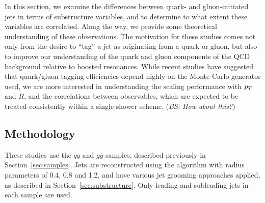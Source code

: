 In this section, we examine the differences between quark- and gluon-initiated jets in terms of substructure variables, and to determine to what extent these variables are correlated. Along the way, we provide some theoretical understanding of these observations. The motivation for these studies comes not only from the desire to ``tag'' a jet as originating from a quark or gluon, but also to improve our  understanding of the quark and gluon components of the QCD background relative to boosted resonances.  While recent studies have suggested that quark/gluon tagging efficiencies depend highly on the Monte Carlo generator used, we are more interested in understanding the scaling performance with $p_T$ and $R$, and the correlations between observables, which are expected to be treated consistently within a single shower scheme. (\emph{BS: How about this?})

\subsection{Methodology}

These studies use the $qq$ and $gg$ samples, described previously in Section~\ref{sec:samples}.
Jets are reconstructed using the \antikt algorithm with 
radius parameters of 0.4, 0.8 and 1.2, and have various
jet grooming approaches applied, as described in Section~\ref{sec:substructure}. 
Only leading and subleading jets in each sample are used. 


